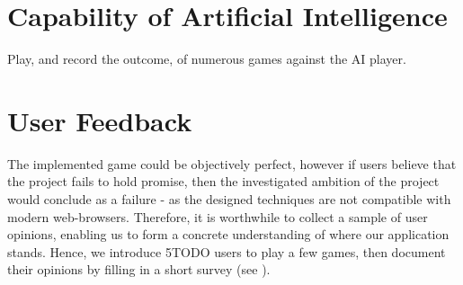 \documentclass{standalone}
\begin{document}
	\section{Capability of Artificial Intelligence}
		Play, and record the outcome, of numerous games against the AI player.

	\section{User Feedback}
		The implemented game could be objectively perfect, however if users believe that the project fails to hold promise, then the investigated ambition of the project would conclude as a failure - as the designed techniques are not compatible with modern web-browsers. Therefore, it is worthwhile to collect a sample of user opinions, enabling us to form a concrete understanding of where our application stands. Hence, we introduce 5TODO users to play a few games, then document their opinions by filling in a short survey (see ).
\end{document}
